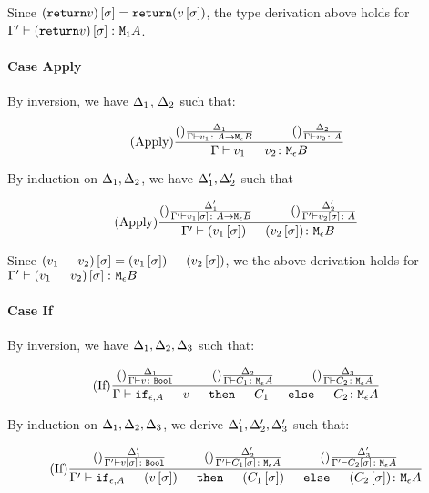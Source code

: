 {        Since $(\texttt{return} v)\left[\sigma\right] = \texttt{return} (v\left[\sigma\right])$, the type derivation above holds for $\Gamma' \vdash (\texttt{return} v)\left[\sigma\right] \colon \texttt{M}_{\texttt{1}}{A}$.

    \paragraph{Case Apply}
        By inversion, we have $\Delta_1$, $\Delta_2$ such that:

        \begin{equation}
            \treerule{Apply}{
                \treerule{}{\D_1}{\typerelation{\G}{v_1}{\aeb}}
                \s\s
                \treerule{}{\D_2}{\typerelation{\G}{v_2}{A}}
            }{\typerelation{\G}{\apply{v_1}{v_2}}{\meb}}
        \end{equation}

        By induction on $\Delta_1, \Delta_2$, we have $\Delta_1',\Delta_2'$ such that

        \begin{equation}
            \treerule{Apply}{
                \treerule{}{\D'_1}{\typerelation{\G'}{v_1\ssi}{\aeb}}
                \s\s
                \treerule{}{\D_2'}{\typerelation{\G'}{v_2\ssi}{A}}
            }{\typerelation{\G'}{\apply{(v_1\ssi)}{(v_2\ssi)}}{\meb}}
        \end{equation}

        Since $(\apply{v_1}{v_2})\ssi = \apply{(v_1\ssi)}{(v_2\ssi)}$, we the above derivation holds for $\typerelation{\G'}{(\apply{v_1}{v_2})\ssi}{\meb}$
    \paragraph{Case If}
        By inversion, we have $\Delta_1,\Delta_2,\Delta_3$ such that:

        \begin{equation}
            \treerule{If}{
                \treerule{}{\D_1}{\typerelation{\G}{v}{\B}}
                \s\s
                \treerule{}{\D_2}{\typerelation{\G}{C_1}{\mea}}
                \s\s
                \treerule{}{\D_3}{\typerelation{\G}{C_2}{\mea}}
            }{
                \typerelation{\G}{\ifthenelse{\e}{A}{v}{C_1}{C_2}}{\mea}
            }
        \end{equation}

        By induction on $\Delta_1,\Delta_2, \Delta_3$, we derive 
        $\Delta_1', \Delta_2',\Delta_3'$ such that:
        
        \begin{equation}
            \treerule{If}{
                \treerule{}{\D_1'}{\typerelation{\G'}{v\ssi}{\B}}
                \s\s
                \treerule{}{\D_2'}{\typerelation{\G'}{C_1\ssi}{\mea}}
                \s\s
                \treerule{}{\D_3'}{\typerelation{\G'}{C_2\ssi}{\mea}}
            }{
                \typerelation{\G'}{\ifthenelse{\e}{A}{(v\ssi)}{(C_1\ssi)}{(C_2\ssi)}}{\mea}
            }
        \end{equation}

}
